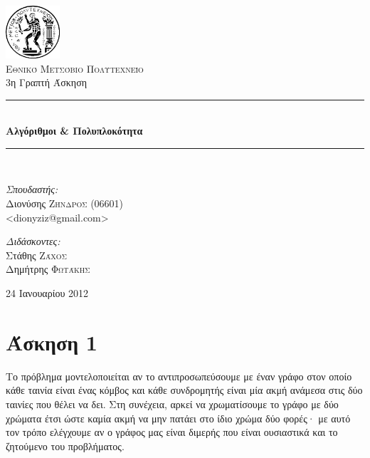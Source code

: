 \documentclass[11pt,a4paper,oneside]{report}
\newcommand{\HRule}{\rule{\linewidth}{0.5mm}}
\begin{document}
\begin{titlepage}
\begin{center}

\includegraphics[width=0.15\textwidth]{Pyrforos3.png}\\[1cm]
\textsc{\LARGE Εθνικό Μετσόβιο Πολυτεχνείο}\\[1.5cm]

\Large{ 3η Γραπτή Άσκηση }\\[0.5cm]

\begin{doublespace}
\HRule \\[0.4cm]
{\huge \bfseries
Αλγόριθμοι \& Πολυπλοκότητα
}\\[0.4cm]
\end{doublespace}

\HRule \\[1.5cm]

\begin{minipage}{0.4\textwidth}
\begin{flushleft} \large
\emph{Σπουδαστής:} \\
Διονύσης \textsc{Ζήνδρος} (06601)\\
\textlatin{\textless dionyziz@gmail.com\textgreater}
\end{flushleft}
\end{minipage}
\begin{minipage}{0.4\textwidth}
\begin{flushright} \large
\emph{Διδάσκοντες:} \\
Στάθης \textsc{Ζάχος}\\
Δημήτρης \textsc{Φωτάκης}
\end{flushright}
\end{minipage}

\vfill

{\large 24 Ιανουαρίου 2012}
\end{center}
\end{titlepage}

\section*{Άσκηση 1}
Το πρόβλημα μοντελοποιείται αν το αντιπροσωπεύσουμε με έναν γράφο στον οποίο κάθε ταινία είναι ένας κόμβος και κάθε συνδρομητής είναι μία ακμή ανάμεσα στις δύο ταινίες που θέλει να δει. Στη συνέχεια, αρκεί να χρωματίσουμε το γράφο με δύο χρώματα έτσι ώστε καμία ακμή να μην πατάει στο ίδιο χρώμα δύο φορές· με αυτό τον τρόπο ελέγχουμε αν ο γράφος μας είναι διμερής που είναι ουσιαστικά και το ζητούμενο του προβλήματος.
\end{document}
